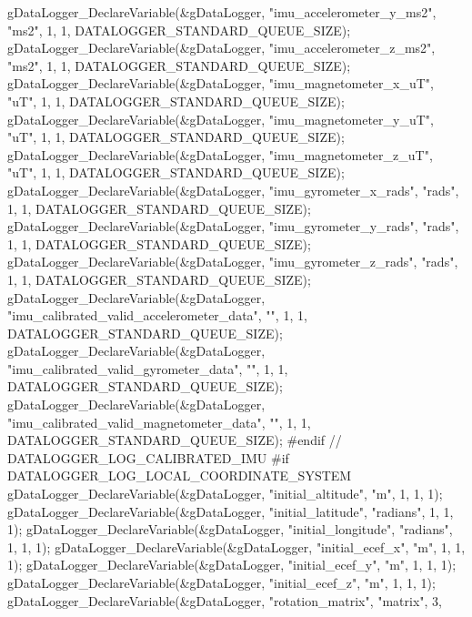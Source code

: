 \begin{DoxyCode}
{\textcolor{comment}{    gDataLogger\_DeclareVariable(&gDataLogger, "imu\_accelerometer\_y\_ms2", "ms2",
       1, 1, DATALOGGER\_STANDARD\_QUEUE\_SIZE);}
\textcolor{comment}{    gDataLogger\_DeclareVariable(&gDataLogger, "imu\_accelerometer\_z\_ms2", "ms2",
       1, 1, DATALOGGER\_STANDARD\_QUEUE\_SIZE);}
\textcolor{comment}{    gDataLogger\_DeclareVariable(&gDataLogger, "imu\_magnetometer\_x\_uT", "uT", 1,
       1, DATALOGGER\_STANDARD\_QUEUE\_SIZE);}
\textcolor{comment}{    gDataLogger\_DeclareVariable(&gDataLogger, "imu\_magnetometer\_y\_uT", "uT", 1,
       1, DATALOGGER\_STANDARD\_QUEUE\_SIZE);}
\textcolor{comment}{    gDataLogger\_DeclareVariable(&gDataLogger, "imu\_magnetometer\_z\_uT", "uT", 1,
       1, DATALOGGER\_STANDARD\_QUEUE\_SIZE);}
\textcolor{comment}{    gDataLogger\_DeclareVariable(&gDataLogger, "imu\_gyrometer\_x\_rads", "rads",
       1, 1, DATALOGGER\_STANDARD\_QUEUE\_SIZE);}
\textcolor{comment}{    gDataLogger\_DeclareVariable(&gDataLogger, "imu\_gyrometer\_y\_rads", "rads",
       1, 1, DATALOGGER\_STANDARD\_QUEUE\_SIZE);}
\textcolor{comment}{    gDataLogger\_DeclareVariable(&gDataLogger, "imu\_gyrometer\_z\_rads", "rads",
       1, 1, DATALOGGER\_STANDARD\_QUEUE\_SIZE);}
\textcolor{comment}{    gDataLogger\_DeclareVariable(&gDataLogger,
       "imu\_calibrated\_valid\_accelerometer\_data", "", 1, 1, DATALOGGER\_STANDARD\_QUEUE\_SIZE);}
\textcolor{comment}{    gDataLogger\_DeclareVariable(&gDataLogger,
       "imu\_calibrated\_valid\_gyrometer\_data", "", 1, 1, DATALOGGER\_STANDARD\_QUEUE\_SIZE);}
\textcolor{comment}{    gDataLogger\_DeclareVariable(&gDataLogger,
       "imu\_calibrated\_valid\_magnetometer\_data", "", 1, 1, DATALOGGER\_STANDARD\_QUEUE\_SIZE);}
\textcolor{comment}{    #endif // DATALOGGER\_LOG\_CALIBRATED\_IMU}
\textcolor{comment}{}
\textcolor{comment}{}
\textcolor{comment}{}
\textcolor{comment}{    #if DATALOGGER\_LOG\_LOCAL\_COORDINATE\_SYSTEM}
\textcolor{comment}{    gDataLogger\_DeclareVariable(&gDataLogger, "initial\_altitude", "m", 1, 1,
       1);}
\textcolor{comment}{    gDataLogger\_DeclareVariable(&gDataLogger, "initial\_latitude", "radians", 1,
       1, 1);}
\textcolor{comment}{    gDataLogger\_DeclareVariable(&gDataLogger, "initial\_longitude", "radians",
       1, 1, 1);}
\textcolor{comment}{    gDataLogger\_DeclareVariable(&gDataLogger, "initial\_ecef\_x", "m", 1, 1, 1);}
\textcolor{comment}{    gDataLogger\_DeclareVariable(&gDataLogger, "initial\_ecef\_y", "m", 1, 1, 1);}
\textcolor{comment}{    gDataLogger\_DeclareVariable(&gDataLogger, "initial\_ecef\_z", "m", 1, 1, 1);}
\textcolor{comment}{    gDataLogger\_DeclareVariable(&gDataLogger, "rotation\_matrix", "matrix", 3,
}}
\end{DoxyCode}
